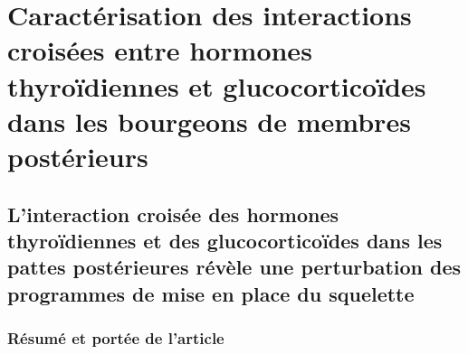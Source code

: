 \documentclass[../main.tex]{subfiles}
\begin{document}
\chapter{Caractérisation des interactions croisées entre hormones thyroïdiennes et glucocorticoïdes dans les bourgeons de membres postérieurs}



\section{L'interaction croisée des hormones thyroïdiennes et des glucocorticoïdes dans les pattes postérieures révèle une perturbation des programmes de mise en place du squelette}


\subsection{Résumé et portée de l'article}\label{subsec:grimaldi2014}
\end{document}
